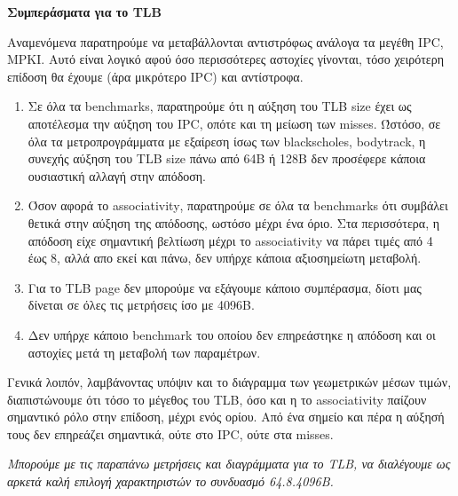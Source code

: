 \begin{center}
    \textbf{Συμπεράσματα για το \textlatin{TLB}}    
\end{center}

Αναμενόμενα παρατηρούμε να μεταβάλλονται αντιστρόφως ανάλογα τα μεγέθη
\textlatin{IPC, MPKI}. Αυτό είναι λογικό αφού όσο περισσότερες αστοχίες
γίνονται, τόσο χειρότερη επίδοση θα έχουμε (άρα μικρότερο \textlatin{IPC})
και αντίστροφα. 

\begin{enumerate}
    \item Σε όλα τα \textlatin{benchmarks}, παρατηρούμε ότι η αύξηση του
    \textlatin{TLB size} έχει ως αποτέλεσμα την αύξηση του \textlatin{IPC},
    οπότε και τη μείωση των \textlatin{misses}. Ώστόσο, σε όλα τα
    μετροπρογράμματα με εξαίρεση ίσως των \textlatin{blackscholes,
    bodytrack}, η συνεχής αύξηση του \textlatin{TLB size} πάνω από 64Β ή 128Β
    δεν προσέφερε κάποια ουσιαστική αλλαγή στην απόδοση.
    
    \item Όσον αφορά το \textlatin{associativity}, παρατηρούμε σε όλα τα
    \textlatin{benchmarks} ότι συμβάλει θετικά στην αύξηση της απόδοσης, ωστόσο
    μέχρι ένα όριο. Στα περισσότερα, η απόδοση είχε σημαντική βελτίωση μέχρι το
    \textlatin{associativity} να πάρει τιμές από 4 έως 8, αλλά απο εκεί και
    πάνω, δεν υπήρχε κάποια αξιοσημείωτη μεταβολή.
    
    \item Για το \textlatin{TLB page} δεν μπορούμε να εξάγουμε κάποιο
    συμπέρασμα, δίοτι μας δίνεται σε όλες τις μετρήσεις ίσο με 4096Β.
    
    \item Δεν υπήρχε κάποιο \textlatin{benchmark} του οποίου δεν επηρεάστηκε η
    απόδοση και οι αστοχίες μετά τη μεταβολή των παραμέτρων.
\end{enumerate}


Γενικά λοιπόν, λαμβάνοντας υπόψιν και το διάγραμμα των γεωμετρικών μέσων τιμών,
διαπιστώνουμε ότι τόσο το μέγεθος του \textlatin{TLB}, όσο και η
το associativity παίζουν σημαντικό ρόλο στην επίδοση, μέχρι ενός ορίου.
Από ένα σημείο και πέρα η αύξησή τους δεν επηρεάζει σημαντικά, ούτε στο
\textlatin{IPC}, ούτε στα \textlatin{misses}.
\vspace{1cm}

\textit{Μπορούμε με τις παραπάνω μετρήσεις και διαγράμματα για το
\textlatin{TLB}, να διαλέγουμε ως αρκετά καλή επιλογή χαρακτηριστών το συνδυασμό
64.8.4096Β.}



